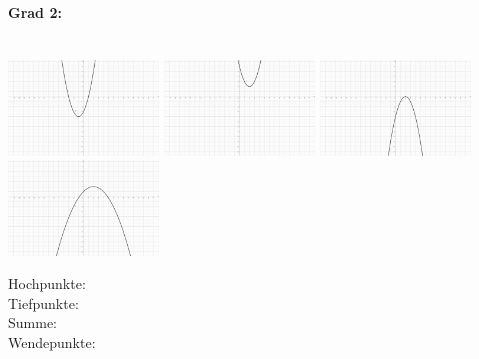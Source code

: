 \documentclass[12pt, parskip=half, a4paper, oneside]{scrartcl}
\begin{document}
\paragraph{Grad 2:}\textcolor{white}{.}\\
\includegraphics[width=4cm]{Bilder/G21}\hfill
\includegraphics[width=4cm]{Bilder/G22}\hfill
\includegraphics[width=4cm]{Bilder/G23}\hfill
\includegraphics[width=4cm]{Bilder/G24}

\begin{addmargin}[-2cm]{0pt}
Hochpunkte: \\
Tiefpunkte: \\
Summe: \\
Wendepunkte:
\end{addmargin}
\end{document}
